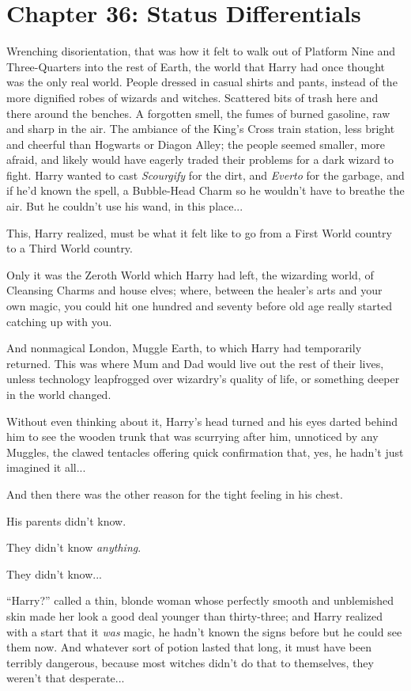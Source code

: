 \chapter{Chapter 36: Status Differentials}
Wrenching disorientation, that was how it felt to walk out of Platform
Nine and Three-Quarters into the rest of Earth, the world that Harry had
once thought was the only real world. People dressed in casual shirts
and pants, instead of the more dignified robes of wizards and witches.
Scattered bits of trash here and there around the benches. A forgotten
smell, the fumes of burned gasoline, raw and sharp in the air. The
ambiance of the King's Cross train station, less bright and cheerful
than Hogwarts or Diagon Alley; the people seemed smaller, more afraid,
and likely would have eagerly traded their problems for a dark wizard to
fight. Harry wanted to cast \emph{Scourgify} for the dirt, and
\emph{Everto} for the garbage, and if he'd known the spell, a
Bubble-Head Charm so he wouldn't have to breathe the air. But he
couldn't use his wand, in this place...

This, Harry realized, must be what it felt like to go from a First World
country to a Third World country.

Only it was the Zeroth World which Harry had left, the wizarding world,
of Cleansing Charms and house elves; where, between the healer's arts
and your own magic, you could hit one hundred and seventy before old age
really started catching up with you.

And nonmagical London, Muggle Earth, to which Harry had temporarily
returned. This was where Mum and Dad would live out the rest of their
lives, unless technology leapfrogged over wizardry's quality of life, or
something deeper in the world changed.

Without even thinking about it, Harry's head turned and his eyes darted
behind him to see the wooden trunk that was scurrying after him,
unnoticed by any Muggles, the clawed tentacles offering quick
confirmation that, yes, he hadn't just imagined it all...

And then there was the other reason for the tight feeling in his chest.

His parents didn't know.

They didn't know \emph{anything}.

They didn't know...

``Harry?'' called a thin, blonde woman whose perfectly smooth and
unblemished skin made her look a good deal younger than thirty-three;
and Harry realized with a start that it \emph{was} magic, he hadn't
known the signs before but he could see them now. And whatever sort of
potion lasted that long, it must have been terribly dangerous, because
most witches didn't do that to themselves, they weren't that
desperate...

